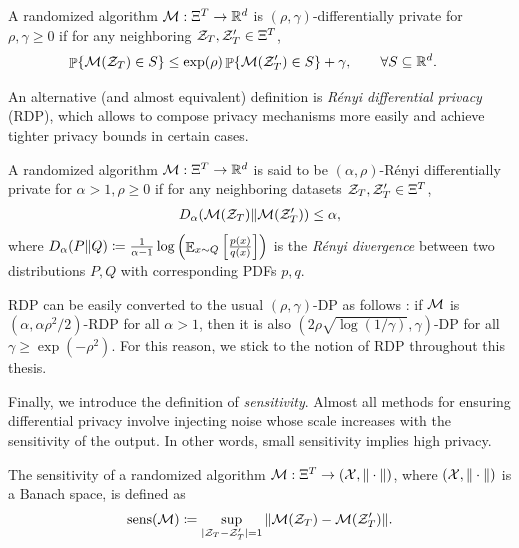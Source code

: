\begin{definition} A randomized algorithm ${\cal M}: \Xi^T \to \mathbb R^d$ is $(\rho,\gamma)$-differentially private for $\rho,\gamma\ge 0$ if for any neighboring ${\cal Z}_T,{\cal Z}_T'\in \Xi^T$,
\begin{align}
    \mathop{\mathbb{P}}\{{\cal M}({\cal Z}_T) \in S\} &\le \exp(\rho)\mathop{\mathbb{P}}\{{\cal M}({\cal Z}_T')\in S\} + \gamma,
    \qquad \forall S\subseteq \mathbb R^d.
    \label{eq:DP-OTB:DP}
\end{align}
\end{definition}

An alternative (and almost equivalent) definition is \emph{R\'enyi differential privacy} (RDP), which allows to compose privacy mechanisms more easily and achieve tighter privacy bounds in certain cases. 

\begin{definition} A randomized algorithm ${\cal M}: \Xi^T \to \mathbb R^d$ is said to be $(\alpha,\rho)$-R\'enyi differentially private for $\alpha>1,\rho\ge0$ if for any neighboring datasets ${\cal Z}_T,{\cal Z}_T' \in \Xi^T$,
\begin{align}
    D_{\alpha}({\cal M}({\cal Z}_T)\|{\cal M}({\cal Z}_T'))\le \alpha,
    \label{eq:DP-OTB:RDP}
\end{align}
where $D_{\alpha}(P\|Q) \coloneqq \frac{1}{\alpha-1}\log \left(\mathop{\mathbb{E}}_{x \sim Q} \left[\frac{p(x)}{q(x)}\right]\right)$ is the \emph{R\'enyi divergence} between two distributions $P,Q$ with corresponding PDFs $p,q$.
\end{definition}

RDP can be easily converted to the usual $(\rho,\gamma)$-DP as follows \citep{mironov2017renyi}: if ${\cal M}$ is $(\alpha, \alpha\rho^2/2)$-RDP for all $\alpha>1$, then it is also $(2\rho\sqrt{\log(1/\gamma)}, \gamma)$-DP for all $\gamma\ge \exp(-\rho^2)$. For this reason, we stick to the notion of RDP throughout this thesis.

Finally, we introduce the definition of \emph{sensitivity}. Almost all methods for ensuring differential privacy involve injecting noise whose scale increases with the sensitivity of the output. In other words, small sensitivity implies high privacy.

\begin{definition}[Sensitivity] 
The sensitivity of a randomized algorithm ${\cal M}: \Xi^T \to ({\cal X},\|\cdot\|)$, where $({\cal X},\|\cdot\|)$ is a Banach space, is defined as
\begin{align}
    \operatorname{sens}({\cal M}) \coloneqq \sup_{|{\cal Z}_T - {\cal Z}_T'|=1} \|{\cal M}({\cal Z}_T) - {\cal M}({\cal Z}_T')\|.
    \label{eq:DP-OTB:sensitivity}
\end{align}
\end{definition}


